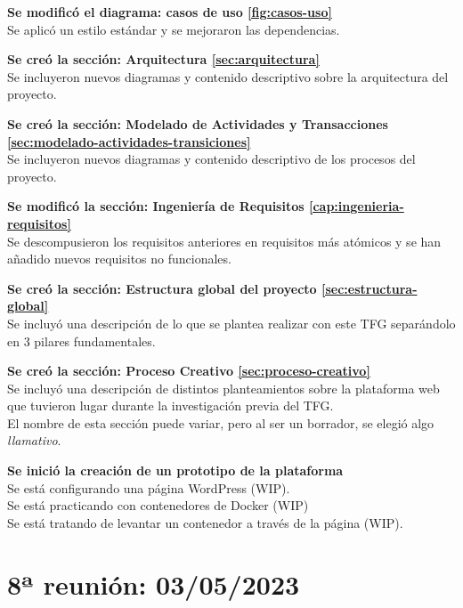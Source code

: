         \textbf{Se modificó el diagrama: casos de uso \ref{fig:casos-uso}} \\
        Se aplicó un estilo estándar y se mejoraron las dependencias.
        
        \textbf{Se creó la sección: Arquitectura \ref{sec:arquitectura}} \\
        Se incluyeron nuevos diagramas y contenido descriptivo sobre la arquitectura del proyecto.
        
        \textbf{Se creó la sección: Modelado de Actividades y Transacciones \ref{sec:modelado-actividades-transiciones}} \\
        Se incluyeron nuevos diagramas y contenido descriptivo de los procesos del proyecto.
        
        \textbf{Se modificó la sección: Ingeniería de Requisitos \ref{cap:ingenieria-requisitos}} \\
        Se descompusieron los requisitos anteriores en requisitos más atómicos y se han añadido nuevos requisitos no funcionales.
    
        \textbf{Se creó la sección: Estructura global del proyecto \ref{sec:estructura-global}} \\
        Se incluyó una descripción de lo que se plantea realizar con este TFG separándolo en 3 pilares fundamentales.
    
        \textbf{Se creó la sección: Proceso Creativo \ref{sec:proceso-creativo}} \\
        Se incluyó una descripción de distintos planteamientos sobre la plataforma web que tuvieron lugar durante la investigación previa del TFG. \\
        El nombre de esta sección puede variar, pero al ser un borrador, se elegió algo \textit{llamativo}.
    
        \textbf{Se inició la creación de un prototipo de la plataforma} \\
        Se está configurando una página WordPress (WIP).\\
        Se está practicando con contenedores de Docker (WIP)\\ 
        Se está tratando de levantar un contenedor a través de la página (WIP).

        \newpage


    \section{8ª reunión: 03/05/2023}

